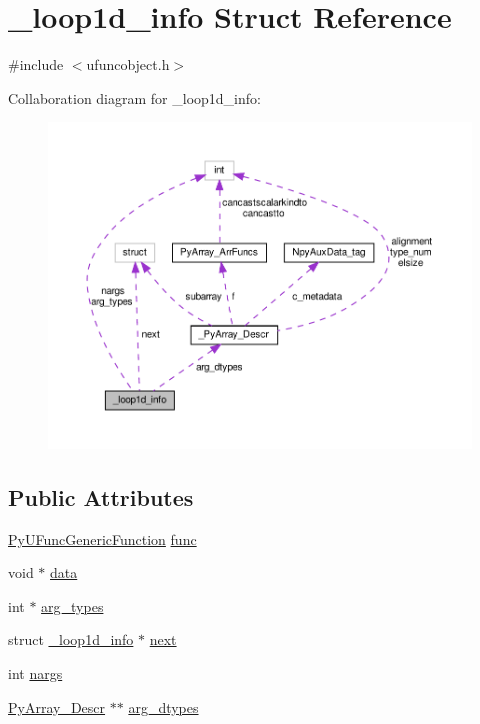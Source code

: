 \hypertarget{struct__loop1d__info}{}\section{\+\_\+loop1d\+\_\+info Struct Reference}
\label{struct__loop1d__info}


{\ttfamily \#include $<$ufuncobject.\+h$>$}



Collaboration diagram for \+\_\+loop1d\+\_\+info\+:
\nopagebreak
\begin{figure}[H]
\begin{center}
\leavevmode
\includegraphics[width=350pt]{struct__loop1d__info__coll__graph}
\end{center}
\end{figure}
\subsection*{Public Attributes}
\begin{DoxyCompactItemize}
\item 
\hyperlink{ufuncobject_8h_a92252cc48bb486d3d9b8504d1495846e}{Py\+U\+Func\+Generic\+Function} \hyperlink{struct__loop1d__info_a4e3115af04d18d092b589f6dce4e9df8}{func}
\item 
void $\ast$ \hyperlink{struct__loop1d__info_aeef622a9d19786db5e373055a1bc62ec}{data}
\item 
int $\ast$ \hyperlink{struct__loop1d__info_a001607561ee05fcfe405a320636279cc}{arg\+\_\+types}
\item 
struct \hyperlink{struct__loop1d__info}{\+\_\+loop1d\+\_\+info} $\ast$ \hyperlink{struct__loop1d__info_ab0866f982039f11fdca4293570de656a}{next}
\item 
int \hyperlink{struct__loop1d__info_a733e2a40b1b5938e2f43d34bbfaf1d55}{nargs}
\item 
\hyperlink{ndarraytypes_8h_a08fb2fb967ebbdd179e08d7b8756bd75}{Py\+Array\+\_\+\+Descr} $\ast$$\ast$ \hyperlink{struct__loop1d__info_ab0261189c74c2a47df5b4b192ca1977b}{arg\+\_\+dtypes}
\end{DoxyCompactItemize}


